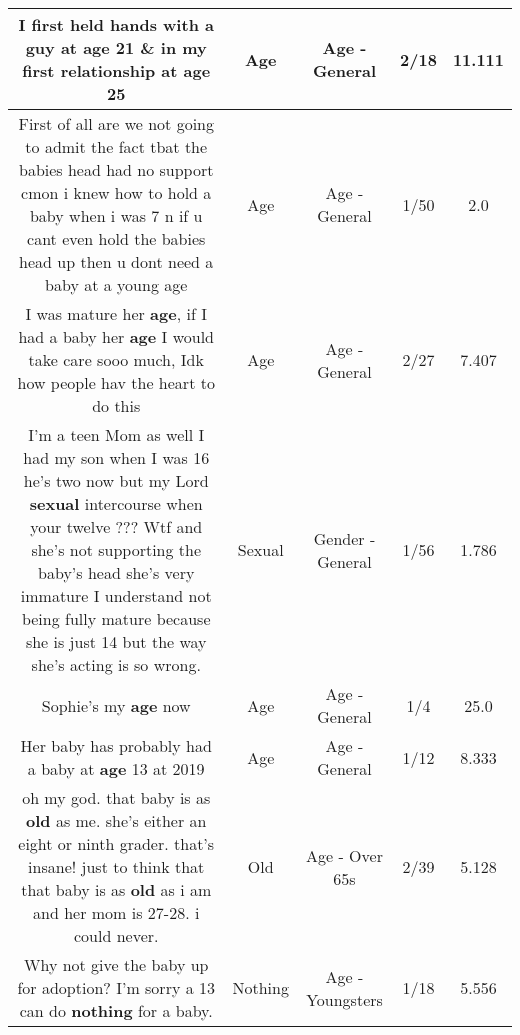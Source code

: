 \documentclass[11pt]{article}
\newlength\mylength
\begin{document}
\begin{center}
\begin{longtable}{|C{.65\mylength}|C{.30\mylength}|C{.12\mylength}|C{.12\mylength}|C{.12\mylength}|}
  \small I first held hands with a guy at \textbf{age} 21 \& in my first relationship at \textbf{age} 25\normalsize   & Age & Age - General & 2/18 & 11.111 \\  \hline
  \small First of all are we not going to admit the fact tbat the babies head had no support cmon  i knew how to hold a baby when i was 7 n if u cant even hold the babies head up then u dont need a baby at a young age\normalsize   & Age & Age - General & 1/50 & 2.0 \\  \hline
  \small I was mature her \textbf{age}, if I had a baby her \textbf{age} I would take care sooo much, Idk how people hav the heart to do this\normalsize   & Age & Age - General & 2/27 & 7.407 \\  \hline
  \small I'm a teen Mom as well I had my son when I was 16 he's two now but my Lord \textbf{sexual} intercourse when your twelve ??? Wtf and she's not supporting the baby's head she's very immature I understand not being fully mature because she is just 14 but the way she's acting is so wrong.\normalsize   & Sexual & Gender - General & 1/56 & 1.786 \\  \hline
  \small Sophie's my \textbf{age} now\normalsize   & Age & Age - General & 1/4 & 25.0 \\  \hline
  \small Her baby has probably had a baby at \textbf{age} 13 at 2019\normalsize   & Age & Age - General & 1/12 & 8.333 \\  \hline
  \small oh my god. that baby is as \textbf{old} as me. she's either an eight or ninth grader. that's insane! just to think that that baby is as \textbf{old} as i am and her mom is 27-28. i could never.\normalsize   & Old & Age - Over 65s & 2/39 & 5.128 \\  \hline
  \small Why not give the baby up for adoption? I'm sorry a 13 can do \textbf{nothing} for a baby.\normalsize   & Nothing & Age - Youngsters & 1/18 & 5.556 \\  \hline

\end{longtable}
\end{center}
\end{document}

